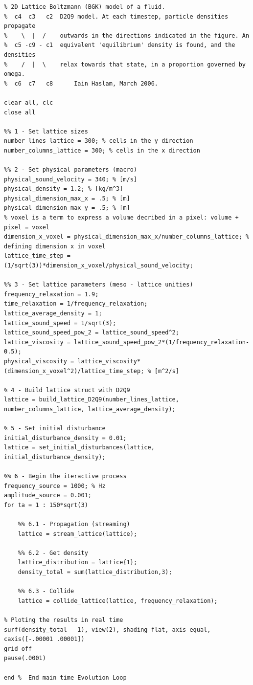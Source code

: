 \begin{lstlisting}
% 2D Lattice Boltzmann (BGK) model of a fluid.
%  c4  c3   c2  D2Q9 model. At each timestep, particle densities propagate
%    \  |  /    outwards in the directions indicated in the figure. An
%  c5 -c9 - c1  equivalent 'equilibrium' density is found, and the densities
%    /  |  \    relax towards that state, in a proportion governed by omega.
%  c6  c7   c8      Iain Haslam, March 2006.

clear all, clc
close all

%% 1 - Set lattice sizes
number_lines_lattice = 300; % cells in the y direction
number_columns_lattice = 300; % cells in the x direction

%% 2 - Set physical parameters (macro)
physical_sound_velocity = 340; % [m/s]
physical_density = 1.2; % [kg/m^3]
physical_dimension_max_x = .5; % [m]
physical_dimension_max_y = .5; % [m]
% voxel is a term to express a volume decribed in a pixel: volume + pixel = voxel
dimension_x_voxel = physical_dimension_max_x/number_columns_lattice; % defining dimension x in voxel
lattice_time_step = (1/sqrt(3))*dimension_x_voxel/physical_sound_velocity;

%% 3 - Set lattice parameters (meso - lattice unities)
frequency_relaxation = 1.9;
time_relaxation = 1/frequency_relaxation;
lattice_average_density = 1;
lattice_sound_speed = 1/sqrt(3);
lattice_sound_speed_pow_2 = lattice_sound_speed^2;
lattice_viscosity = lattice_sound_speed_pow_2*(1/frequency_relaxation-0.5);
physical_viscosity = lattice_viscosity*(dimension_x_voxel^2)/lattice_time_step; % [m^2/s]

% 4 - Build lattice struct with D2Q9
lattice = build_lattice_D2Q9(number_lines_lattice, number_columns_lattice, lattice_average_density);

% 5 - Set initial disturbance
initial_disturbance_density = 0.01;
lattice = set_initial_disturbances(lattice, initial_disturbance_density);

%% 6 - Begin the iteractive process
frequency_source = 1000; % Hz
amplitude_source = 0.001;
for ta = 1 : 150*sqrt(3)
    
    %% 6.1 - Propagation (streaming)
    lattice = stream_lattice(lattice);

    %% 6.2 - Get density
    lattice_distribution = lattice{1};
    density_total = sum(lattice_distribution,3);

    %% 6.3 - Collide
    lattice = collide_lattice(lattice, frequency_relaxation);
    
% Ploting the results in real time   
surf(density_total - 1), view(2), shading flat, axis equal, caxis([-.00001 .00001])
grid off
pause(.0001) 

end %  End main time Evolution Loop
\end{lstlisting}



